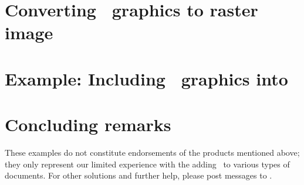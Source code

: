 \section{Converting \gmt\ graphics to raster image}

\section{Example: Including \gmt\ graphics into }

\section{Concluding remarks}

These examples do not constitute endorsements of the products mentioned above; they only represent our limited experience with the adding \PS\ to various types of documents.  For other solutions and further help, please post messages to
.
